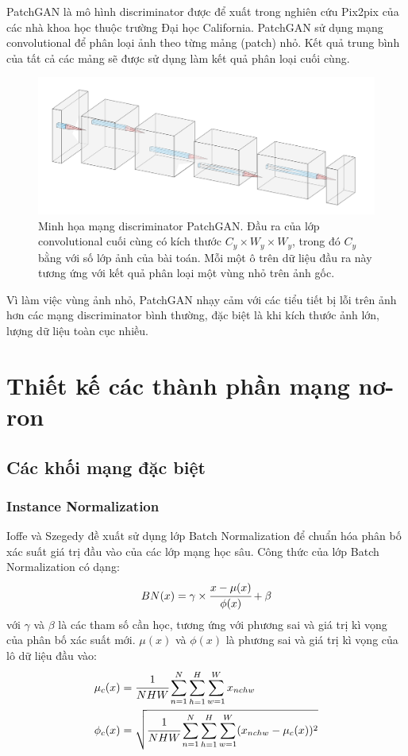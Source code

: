 \documentclass[12pt]{extreport}
\begin{document}
PatchGAN là mô hình discriminator được để xuất trong nghiên cứu Pix2pix của các nhà khoa học thuộc trường Đại học California. PatchGAN sử dụng mạng convolutional để phân loại ảnh theo từng mảng (patch) nhỏ. Kết quả trung bình của tất cả các mảng sẽ được sử dụng làm kết quả phân loại cuối cùng.

\begin{figure}[H]
    \centering
    \includegraphics[width=\linewidth]{figure37.png}
    \caption{Minh họa mạng discriminator PatchGAN. Đầu ra của lớp convolutional cuối cùng có kích thước $ C_y \times W_y \times W_y $, trong đó $ C_y $ bằng với số lớp ảnh của bài toán. Mỗi một ô trên dữ liệu đầu ra này tương ứng với kết quả phân loại một vùng nhỏ trên ảnh gốc.}
\end{figure}

Vì làm việc vùng ảnh nhỏ, PatchGAN nhạy cảm với các tiểu tiết bị lỗi trên ảnh hơn các mạng discriminator bình thường, đặc biệt là khi kích thước ảnh lớn, lượng dữ liệu toàn cục nhiều.

\section{Thiết kế các thành phần mạng nơ-ron}

\subsection{Các khối mạng đặc biệt}

\subsubsection{Instance Normalization}

Ioffe và Szegedy đề xuất sử dụng lớp Batch Normalization \cite{DBLP:journals/corr/IoffeS15} để chuẩn hóa phân bố xác suất giá trị đầu vào của các lớp mạng học sâu. Công thức của lớp Batch Normalization có dạng:
$$ BN(x) = \gamma \times \cfrac{x - \mu(x)}{\phi(x)} + \beta $$
với $ \gamma $ và $ \beta $ là các tham số cần học, tương ứng với phương sai và giá trị kì vọng của phân bố xác suất mới. $ \mu(x) $ và $ \phi(x) $ là phương sai và giá trị kì vọng của lô dữ liệu đầu vào:
\begin{align*}
    \mu_c(x)  & = \cfrac{1}{NHW} \sum_{n = 1}^{N} \sum_{h = 1}^{H} \sum_{w = 1}^{W} x_{nchw}                       \\
    \phi_c(x) & = \sqrt{\cfrac{1}{NHW} \sum_{n = 1}^{N} \sum_{h = 1}^{H} \sum_{w = 1}^{W} (x_{nchw} - \mu_c(x))^2}
\end{align*}
\end{document}
